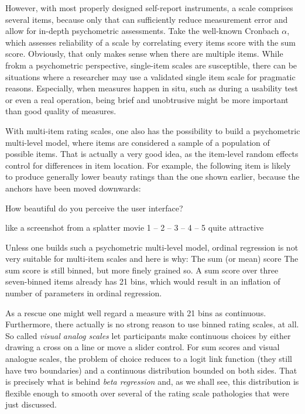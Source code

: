 \documentclass[]{svmono}
\theoremstyle{definition}
\theoremstyle{definition}
\theoremstyle{definition}
\theoremstyle{remark}
\begin{document}
However, with most properly designed self-report instruments, a scale
comprises several items, because only that can sufficiently reduce
measurement error and allow for in-depth psychometric assessments. Take
the well-known Cronbach \(\alpha\), which assesses reliability of a
scale by correlating every items score with the sum score. Obviously,
that only makes sense when there are multiple items. While frokm a
psychometric perspective, single-item scales are susceptible, there can
be situations where a researcher may use a validated single item scale
for pragmatic reasons. Especially, when measures happen in situ, such as
during a usability test or even a real operation, being brief and
unobtrusive might be more important than good quality of measures.

With multi-item rating scales, one also has the possibility to build a
psychometric multi-level model, where items are considered a sample of a
population of possible items. That is actually a very good idea, as the
item-level random effects control for differences in item location. For
example, the following item is likely to produce generally lower beauty
ratings than the one shown earlier, because the anchors have been moved
downwards:

How beautiful do you perceive the user interface?

like a screenshot from a splatter movie 1 -- 2 -- 3 -- 4 -- 5 quite
attractive

Unless one builds such a psychometric multi-level model, ordinal
regression is not very suitable for multi-item scales and here is why:
The sum (or mean) score The sum score is still binned, but more finely
grained so. A sum score over three seven-binned items already has 21
bins, which would result in an inflation of number of parameters in
ordinal regression.

As a rescue one might well regard a measure with 21 bins as continuous.
Furthermore, there actually is no strong reason to use binned rating
scales, at all. So called \emph{visual analog scales} let participants
make continuous choices by either drawing a cross on a line or move a
slider control. For sum scores and visual analogue scales, the problem
of choice reduces to a logit link function (they still have two
boundaries) and a continuous distribution bounded on both sides. That is
precisely what is behind \emph{beta regression} and, as we shall see,
this distribution is flexible enough to smooth over several of the
rating scale pathologies that were just discussed.
\end{document}
